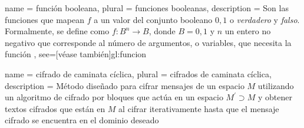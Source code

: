 {
  name = función booleana,
  plural = funciones booleanas,
  description = {
    Son las funciones que mapean $f$ a un valor del conjunto booleano ${0,1}$ o \textit{verdadero} y \textit{falso}.
    Formalmente, se define como $f: B^n \rightarrow B$, donde $B={0,1}$
    y $n$ un entero no negativo que corresponde al número de argumentos,
    o variables, que necesita la función%
  },
  see=[véase también]{gl:funcion}
}

{
  name = cifrado de caminata cíclica,
  plural = cifrados de caminata cíclica,
  description = {
    Método diseñado para cifrar mensajes de un espacio $M$ utilizando un
    algoritmo de cifrado por bloques que actúa en un espacio
    $M^\prime \supset M$ y obtener textos cifrados que están en $M$ al cifrar
    iterativamente hasta que el mensaje cifrado se encuentra en el dominio
    deseado%
  }
}

\glsaddall
